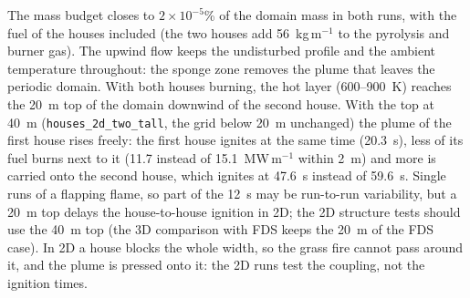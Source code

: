 \documentclass[11pt,a4paper]{article}
\newcommand{\code}[1]{\texttt{#1}}
\begin{document}
The mass budget closes to $2\times10^{-5}$\% of the domain mass in both runs, with the fuel of the houses
included (the two houses add 56~kg\,m$^{-1}$ to the pyrolysis and burner gas). The upwind flow keeps the
undisturbed profile and the ambient temperature throughout: the sponge zone removes the plume that leaves
the periodic domain. With both houses burning, the hot layer (600--900~K) reaches the 20~m top of the domain
downwind of the second house. With the top at 40~m (\code{houses\_2d\_two\_tall}, the grid below 20~m
unchanged) the plume of the first house rises freely: the first house ignites at the same time (20.3~s), less
of its fuel burns next to it (11.7 instead of 15.1~MW\,m$^{-1}$ within 2~m) and more is carried onto the second
house, which ignites at 47.6~s instead of 59.6~s. Single runs of a flapping flame, so part of the 12~s may be
run-to-run variability, but a 20~m top delays the house-to-house ignition in 2D; the 2D structure tests should
use the 40~m top (the 3D comparison with FDS keeps the 20~m of the FDS case). In 2D a house blocks the whole
width, so the grass fire cannot pass around it, and the plume is pressed onto it: the 2D runs test the
coupling, not the ignition times.
\end{document}
